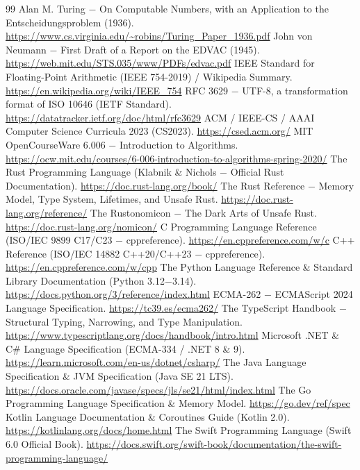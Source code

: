 \documentclass{book}
\begin{document}
\begin{thebibliography}{99}
 Alan M. Turing \(-\) On Computable Numbers, with an Application to the Entscheidungsproblem (1936). \url{https://www.cs.virginia.edu/~robins/Turing_Paper_1936.pdf}
 John von Neumann \(-\) First Draft of a Report on the EDVAC (1945). \url{https://web.mit.edu/STS.035/www/PDFs/edvac.pdf}
 IEEE Standard for Floating-Point Arithmetic (IEEE 754-2019) / Wikipedia Summary. \url{https://en.wikipedia.org/wiki/IEEE_754}
 RFC 3629 \(-\) UTF-8, a transformation format of ISO 10646 (IETF Standard). \url{https://datatracker.ietf.org/doc/html/rfc3629}
 ACM / IEEE-CS / AAAI Computer Science Curricula 2023 (CS2023). \url{https://csed.acm.org/}
 MIT OpenCourseWare 6.006 \(-\) Introduction to Algorithms. \url{https://ocw.mit.edu/courses/6-006-introduction-to-algorithms-spring-2020/}
 The Rust Programming Language (Klabnik \& Nichols \(-\) Official Rust Documentation). \url{https://doc.rust-lang.org/book/}
 The Rust Reference \(-\) Memory Model, Type System, Lifetimes, and Unsafe Rust. \url{https://doc.rust-lang.org/reference/}
 The Rustonomicon \(-\) The Dark Arts of Unsafe Rust. \url{https://doc.rust-lang.org/nomicon/}
 C Programming Language Reference (ISO/IEC 9899 C17/C23 \(-\) cppreference). \url{https://en.cppreference.com/w/c}
 C++ Reference (ISO/IEC 14882 C++20/C++23 \(-\) cppreference). \url{https://en.cppreference.com/w/cpp}
 The Python Language Reference \& Standard Library Documentation (Python 3.12\(-\)3.14). \url{https://docs.python.org/3/reference/index.html}
 ECMA-262 \(-\) ECMAScript 2024 Language Specification. \url{https://tc39.es/ecma262/}
 The TypeScript Handbook \(-\) Structural Typing, Narrowing, and Type Manipulation. \url{https://www.typescriptlang.org/docs/handbook/intro.html}
 Microsoft .NET \& C\# Language Specification (ECMA-334 / .NET 8 \& 9). \url{https://learn.microsoft.com/en-us/dotnet/csharp/}
 The Java Language Specification \& JVM Specification (Java SE 21 LTS). \url{https://docs.oracle.com/javase/specs/jls/se21/html/index.html}
 The Go Programming Language Specification \& Memory Model. \url{https://go.dev/ref/spec}
 Kotlin Language Documentation \& Coroutines Guide (Kotlin 2.0). \url{https://kotlinlang.org/docs/home.html}
 The Swift Programming Language (Swift 6.0 Official Book). \url{https://docs.swift.org/swift-book/documentation/the-swift-programming-language/}

\end{thebibliography}
\end{document}
